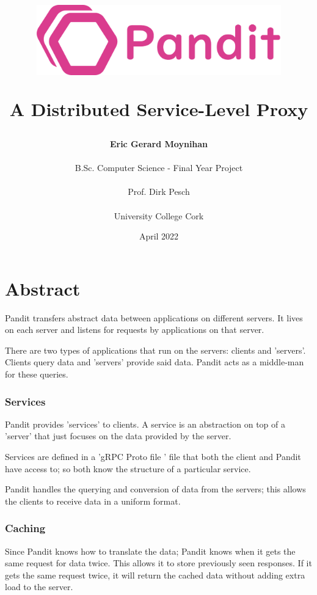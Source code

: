 \documentclass[a4paper,12pt]{report}
\title{
    \begin{figure}[hbt!]
        \centering
        \includegraphics[width=300pt]{pandit.png}
    \end{figure} 
    A Distributed Service-Level Proxy}
\author{
    \textbf{Eric Gerard Moynihan}
\\\\\small{B.Sc. Computer Science - Final Year Project}
\\\\\small{Prof. Dirk Pesch}
\\\\\small{University College Cork}
}
\date{April 2022}
\begin{document}

\maketitle

\chapter*{Abstract}
Pandit transfers abstract data between applications on different servers. It lives on each server and listens for requests by applications on that server.

There are two types of applications that run on the servers: clients and 'servers'. Clients query data and 'servers' provide said data. Pandit acts as a middle-man for these queries.

\subsection*{Services}

Pandit provides 'services' to clients. A service is an abstraction on top of a 'server' that just focuses on the data provided by the server.

Services are defined in a 'gRPC \cite{grpc} Proto file \cite{protobuf}' file that both the client and Pandit have access to; so both know the structure of a particular service.

Pandit handles the querying and conversion of data from the servers; this allows the clients to receive data in a uniform format.

\subsection*{Caching}

Since Pandit knows how to translate the data; Pandit knows when it gets the same request for data twice. This allows it to store previously seen responses. If it gets the same request twice, it will return the cached data without adding extra load to the server.
\end{document}
